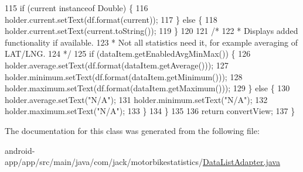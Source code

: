 \begin{DoxyCode}
115             \textcolor{keywordflow}{if} (current instanceof Double) \{
116                 holder.current.setText(df.format(current));
117             \} \textcolor{keywordflow}{else} \{
118                 holder.current.setText(current.toString());
119             \}
120 
121             \textcolor{comment}{/*}
122 \textcolor{comment}{             * Displays added functionality if available.}
123 \textcolor{comment}{             * Not all statistics need it, for example averaging of LAT/LNG.}
124 \textcolor{comment}{             */}
125             \textcolor{keywordflow}{if} (dataItem.getEnabledAvgMinMax()) \{
126                 holder.average.setText(df.format(dataItem.getAverage()));
127                 holder.minimum.setText(df.format(dataItem.getMinimum()));
128                 holder.maximum.setText(df.format(dataItem.getMaximum()));
129             \} \textcolor{keywordflow}{else} \{
130                 holder.average.setText(\textcolor{stringliteral}{"N/A"});
131                 holder.minimum.setText(\textcolor{stringliteral}{"N/A"});
132                 holder.maximum.setText(\textcolor{stringliteral}{"N/A"});
133             \}
134         \}
135 
136         \textcolor{keywordflow}{return} convertView;
137     \}
\end{DoxyCode}


The documentation for this class was generated from the following file\+:\begin{DoxyCompactItemize}
\item 
android-\/app/app/src/main/java/com/jack/motorbikestatistics/\hyperlink{_data_list_adapter_8java}{Data\+List\+Adapter.\+java}\end{DoxyCompactItemize}
